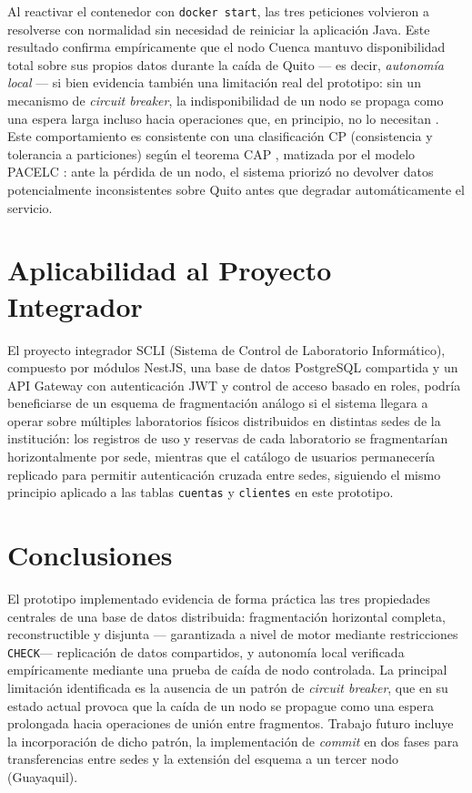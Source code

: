 \documentclass[conference]{IEEEtran}
\begin{document}
Al reactivar el contenedor con \texttt{docker start}, las tres peticiones
volvieron a resolverse con normalidad sin necesidad de reiniciar la
aplicaci\'on Java. Este resultado confirma emp\'iricamente que el nodo Cuenca
mantuvo disponibilidad total sobre sus propios datos durante la ca\'ida de
Quito --- es decir, \emph{autonom\'ia local} --- si bien evidencia tambi\'en
una limitaci\'on real del prototipo: sin un mecanismo de \emph{circuit
breaker}, la indisponibilidad de un nodo se propaga como una espera larga
incluso hacia operaciones que, en principio, no lo necesitan \cite{newman2021}.
Este comportamiento es consistente con una clasificaci\'on CP (consistencia
y tolerancia a particiones) seg\'un el teorema CAP \cite{brewer2000}
\cite{gilbert2002}, matizada por el modelo PACELC \cite{abadi2012}: ante la
p\'erdida de un nodo, el sistema prioriz\'o no devolver datos potencialmente
inconsistentes sobre Quito antes que degradar autom\'aticamente el servicio.

\section{Aplicabilidad al Proyecto Integrador}

El proyecto integrador SCLI (Sistema de Control de Laboratorio Inform\'atico),
compuesto por m\'odulos NestJS, una base de datos PostgreSQL compartida y un
API Gateway con autenticaci\'on JWT y control de acceso basado en roles,
podr\'ia beneficiarse de un esquema de fragmentaci\'on an\'alogo si el sistema
llegara a operar sobre m\'ultiples laboratorios f\'isicos distribuidos en
distintas sedes de la instituci\'on: los registros de uso y reservas de cada
laboratorio se fragmentar\'ian horizontalmente por sede, mientras que el
cat\'alogo de usuarios permanecer\'ia replicado para permitir autenticaci\'on
cruzada entre sedes, siguiendo el mismo principio aplicado a las tablas
\texttt{cuentas} y \texttt{clientes} en este prototipo.

\section{Conclusiones}

El prototipo implementado evidencia de forma pr\'actica las tres propiedades
centrales de una base de datos distribuida: fragmentaci\'on horizontal
completa, reconstructible y disjunta --- garantizada a nivel de motor mediante
restricciones \texttt{CHECK}--- replicaci\'on de datos compartidos, y
autonom\'ia local verificada emp\'iricamente mediante una prueba de ca\'ida de
nodo controlada. La principal limitaci\'on identificada es la ausencia de un
patr\'on de \emph{circuit breaker}, que en su estado actual provoca que la
ca\'ida de un nodo se propague como una espera prolongada hacia operaciones de
uni\'on entre fragmentos. Trabajo futuro incluye la incorporaci\'on de dicho
patr\'on, la implementaci\'on de \emph{commit} en dos fases para transferencias
entre sedes y la extensi\'on del esquema a un tercer nodo (Guayaquil).
\end{document}
